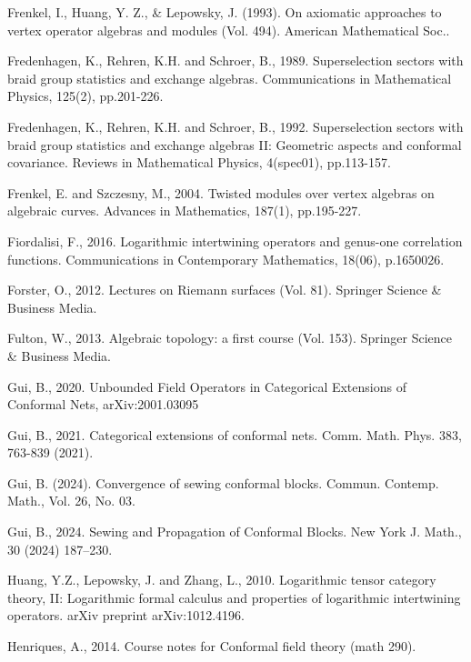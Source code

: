 \documentclass[11pt,b5paper,notitlepage]{article}
\theoremstyle{definition}
\theoremstyle{plain}
\numberwithin{equation}{subsection}
\begin{document}
\begin{thebibliography}{999999}
Frenkel, I., Huang, Y. Z., \& Lepowsky, J. (1993). On axiomatic approaches to vertex operator algebras and modules (Vol. 494). American Mathematical Soc..


Fredenhagen, K., Rehren, K.H. and Schroer, B., 1989. Superselection sectors with braid group statistics and exchange algebras. Communications in Mathematical Physics, 125(2), pp.201-226.

Fredenhagen, K., Rehren, K.H. and Schroer, B., 1992. Superselection sectors with braid group statistics and exchange algebras II: Geometric aspects and conformal covariance. Reviews in Mathematical Physics, 4(spec01), pp.113-157.

Frenkel, E. and Szczesny, M., 2004. Twisted modules over vertex algebras on algebraic curves. Advances in Mathematics, 187(1), pp.195-227.

Fiordalisi, F., 2016. Logarithmic intertwining operators and genus-one correlation functions. Communications in Contemporary Mathematics, 18(06), p.1650026.		


Forster, O., 2012. Lectures on Riemann surfaces (Vol. 81). Springer Science \& Business Media.

Fulton, W., 2013. Algebraic topology: a first course (Vol. 153). Springer Science \& Business Media.


Gui, B., 2020. Unbounded Field Operators in Categorical Extensions of Conformal Nets,  arXiv:2001.03095


Gui, B., 2021. Categorical extensions of conformal nets. Comm. Math. Phys. 383, 763-839 (2021).



Gui, B. (2024). Convergence of sewing conformal blocks. Commun. Contemp. Math., Vol. 26, No. 03.

Gui, B., 2024. Sewing and Propagation of Conformal Blocks. New York J. Math., 30 (2024) 187–230.

Huang, Y.Z., Lepowsky, J. and Zhang, L., 2010. Logarithmic tensor category theory, II: Logarithmic formal calculus and properties of logarithmic intertwining operators. arXiv preprint arXiv:1012.4196.

Henriques, A., 2014. Course notes for Conformal field theory (math 290).



\end{thebibliography}
\end{document}
